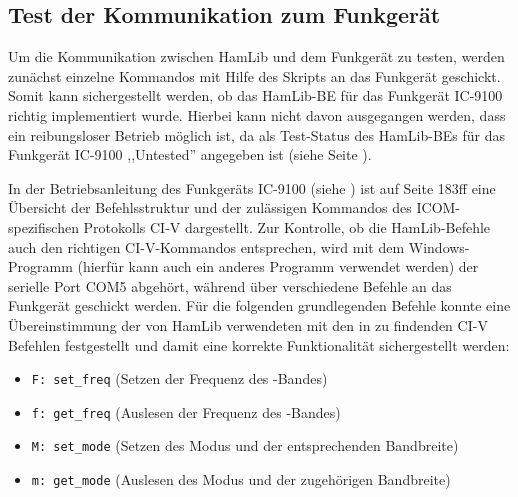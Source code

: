 \subsection{Test der Kommunikation zum Funkgerät}
\label{chap:rigtest}

Um die Kommunikation zwischen HamLib und dem Funkgerät zu testen, werden zunächst einzelne Kommandos mit Hilfe des Skripts  an das Funkgerät geschickt. Somit kann sichergestellt werden, ob das HamLib-\acl{BE} für das Funkgerät IC-9100 richtig implementiert wurde. Hierbei kann nicht davon ausgegangen werden, dass ein reibungsloser Betrieb möglich ist, da als Test-Status des HamLib-\acl{BE}s für das Funkgerät IC-9100 ,,Untested'' angegeben ist (siehe Seite \pageref{hamlibbackend}).

\newpage

In der Betriebsanleitung des Funkgeräts IC-9100 (siehe \cite{radiomanual}) ist auf Seite 183ff eine Übersicht der Befehlsstruktur und der zulässigen Kommandos des ICOM-spezifischen Protokolls CI-V dargestellt. Zur Kontrolle, ob die HamLib-Befehle auch den richtigen CI-V-Kommandos entsprechen, wird mit dem Windows-Programm  (hierfür kann auch ein anderes Programm verwendet werden) der serielle Port COM5 abgehört, während über  verschiedene Befehle an das Funkgerät geschickt werden.\newpar
Für die folgenden grundlegenden Befehle konnte eine Übereinstimmung der von HamLib verwendeten mit den in \cite{radiomanual} zu findenden CI-V Befehlen festgestellt und damit eine korrekte Funktionalität sichergestellt werden:

\begin{itemize}
	\parskip0pt
	\item \texttt{F: set\_freq} (Setzen der Frequenz des -Bandes)
	\item \texttt{f: get\_freq} (Auslesen der Frequenz des -Bandes)
	\item \texttt{M: set\_mode} (Setzen des Modus und der entsprechenden Bandbreite)
	\item \texttt{m: get\_mode} (Auslesen des Modus und der zugehörigen Bandbreite)
\end{itemize}

